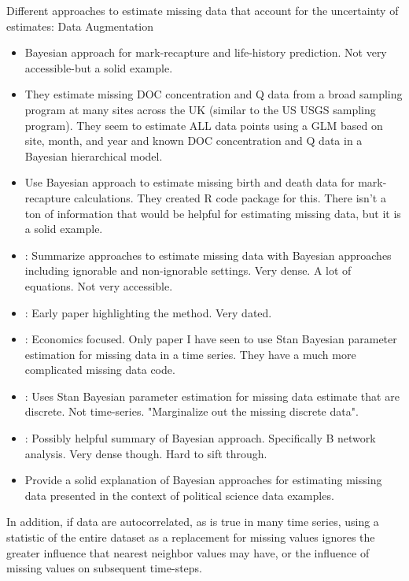  Different approaches to estimate missing data that account for the uncertainty of estimates:
Data Augmentation
  \begin{itemize}
 \item \cite{clark_hierarchical_2005} Bayesian approach for mark-recapture and life-history prediction. Not very accessible-but a solid example.
 \item \cite{worrall_dissolved_2020} They estimate missing DOC concentration and Q data from a broad sampling program at many sites across the UK (similar to the US USGS sampling program). They seem to estimate ALL data points using a GLM based on site, month, and year and known DOC concentration and Q data in a Bayesian hierarchical model. 
\item \cite{colchero_basta_2012} Use Bayesian approach to estimate missing birth and death data for mark-recapture calculations. They created R code package for this. There isn't a ton of information that would be helpful for estimating missing data, but it is a solid example. 
 \item \cite{ma_bayesian_2018}: Summarize approaches to estimate missing data with Bayesian approaches including ignorable and non-ignorable settings. Very dense. A lot of equations. Not very accessible. 
\item \cite{kong_sequential_1994}: Early paper highlighting the method. Very dated.
\item \cite{bertschinger_bayesian_2021}: Economics focused. Only paper I have seen to use Stan Bayesian parameter estimation for missing data in a time series. They have a much more complicated missing data code. 
\item \cite{chatzilena_contemporary_2019}: Uses Stan Bayesian parameter estimation for missing data estimate that are discrete. Not time-series. "Marginalize out the missing discrete data".
\item \cite{scutari_bayesian_2019}: Possibly helpful summary of Bayesian approach. Specifically B network analysis. Very dense though. Hard to sift through.
\item \cite{jackman_estimation_2000} Provide a solid explanation of Bayesian approaches for estimating missing data presented in the context of political science data examples.
   \end{itemize}

In addition, if data are autocorrelated, as is true in many time series, using a statistic of the entire dataset as a replacement for missing values ignores the greater influence that nearest neighbor values may have, or the influence of missing values on subsequent time-steps.

